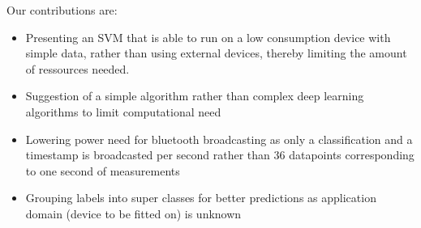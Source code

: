 Our contributions are:
\begin{itemize}
    \item Presenting an SVM  that is able to run on a low consumption device with simple data, rather than using external devices, thereby limiting the amount of ressources needed. 
    \item Suggestion of a simple algorithm rather than complex deep learning algorithms to limit computational need 
    \item Lowering power need for bluetooth broadcasting as only a classification and a timestamp is broadcasted per second rather than 36 datapoints  corresponding to one second of measurements 
    \item Grouping labels into super classes for better predictions as application domain (device to be fitted on) is unknown 
\end{itemize}
